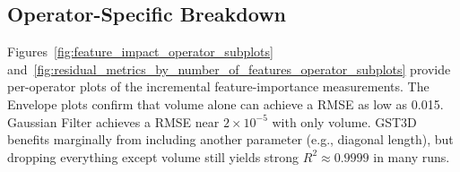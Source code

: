 \subsection{Operator-Specific Breakdown}
\label{subsec:operator-specific-breakdown}

Figures~\ref{fig:feature_impact_operator_subplots} and~\ref{fig:residual_metrics_by_number_of_features_operator_subplots} provide per-operator plots of the incremental feature-importance measurements.
The Envelope plots confirm that volume alone can achieve a \ac{RMSE} as low as 0.015.
Gaussian Filter achieves a \ac{RMSE} near \(2\times10^{-5}\) with only volume.
\ac{GST3D} benefits marginally from including another parameter (e.g., diagonal length), but dropping everything except volume still yields strong $R^2 \approx 0.9999$ in many runs.

